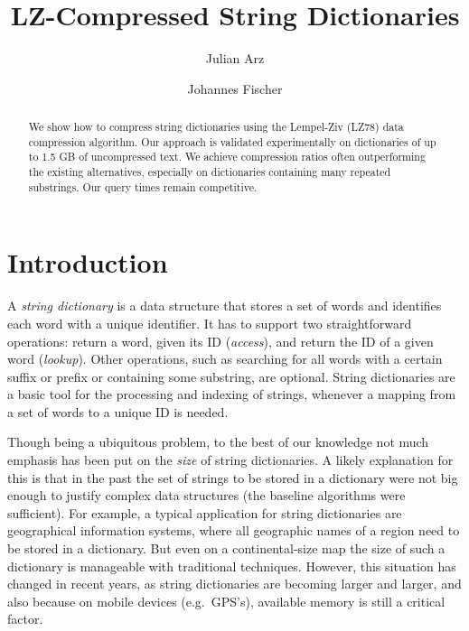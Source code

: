 \documentclass{llncs}
\title{LZ-Compressed String Dictionaries}
\author{Julian Arz \and Johannes Fischer}
\institute{
  KIT, Karlsruhe, Germany.
  \email{julian.arz@student.kit.edu,johannes.fischer@kit.edu}
}
\newcommand{\newterm}[1]{\textit{#1}}
\begin{document}
\maketitle

\begin{abstract}
We show how to compress string dictionaries using the Lempel-Ziv
(LZ78) data compression algorithm.  Our approach is validated
experimentally on dictionaries of up to 1.5 GB of uncompressed text.
We achieve compression ratios often outperforming the existing
alternatives, especially on dictionaries containing many repeated
substrings. Our query times remain competitive.
\end{abstract}

\section{Introduction}
A \newterm{string dictionary} is a data structure that stores a set of words and identifies each word with a unique identifier. It has to support two straightforward operations: return a word, given its ID (\emph{access}), and return the ID of a given word (\emph{lookup}). Other operations, such as searching for all words with a certain suffix or prefix or containing some substring, are optional. String dictionaries are a basic tool for the processing and indexing of strings, whenever a mapping from a set of words to a unique ID is needed.




Though being a ubiquitous problem, to the best of our knowledge not much emphasis has been put on the \emph{size} of string dictionaries. A likely explanation for this is that in the past the set of strings to be stored in a dictionary were not big enough to justify complex data structures (the baseline algorithms were sufficient). For example, a typical application for string dictionaries are geographical information systems, where all geographic names of a region need to be stored in a dictionary. But even on a continental-size map the size of such a dictionary is manageable with traditional techniques. However, this situation has changed in recent years, as string dictionaries are becoming larger and larger, and also because on mobile devices (e.g.~GPS's), available memory is still a critical factor.
\end{document}
